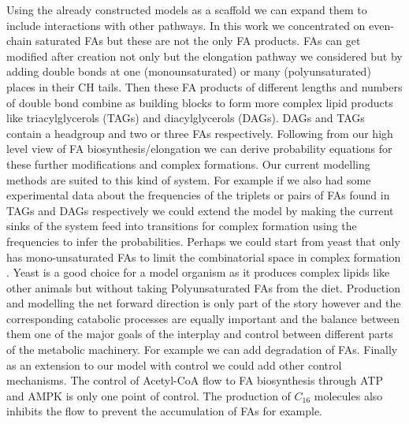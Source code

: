 Using the already constructed models as a scaffold we can expand
them to include interactions with other pathways. In this work we
concentrated on even-chain saturated FAs but these are not the only FA
products. FAs can get modified after creation not only but the
elongation pathway we considered but by adding double bonds at one
(monounsaturated) or many (polyunsaturated) places in their CH
tails. Then these FA products of different lengths and numbers of
double bond combine as building blocks to form more complex lipid
products like triacylglycerols (TAGs) and diacylglycerols (DAGs). DAGs
and TAGs contain a headgroup and two or three FAs
respectively. Following from our high level view of FA
biosynthesis/elongation we can derive probability equations for these further
modifications and complex formations. Our current
modelling methods are suited to this kind of system. For example
if we also had some experimental data about the frequencies of the
triplets or pairs of FAs found in TAGs and DAGs respectively we could
extend the model by making the current sinks of the system feed into
transitions for complex formation using the frequencies to infer the
probabilities. Perhaps we could start from yeast that only has
mono-unsaturated FAs to limit the combinatorial space in complex
formation \cite [] {nielsen2009systems}. Yeast is a good choice for a
model organism as it produces complex lipids like other animals but
without taking Polyunsaturated FAs from the diet.
Production and modelling the net forward direction is only part of
the story however and the corresponding catabolic processes are
equally important and the balance between them one of the major goals
of the interplay and control between different parts of the metabolic
machinery. For example we can add degradation of
FAs. Finally as an extension to our model with control we could add
other control mechanisms. The control of Acetyl-CoA flow to FA
biosynthesis through ATP and AMPK is only one point of control. The
production of $C_{16}$ molecules also inhibits the flow to prevent the
accumulation of FAs for example.


